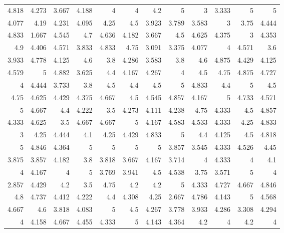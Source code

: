 \documentclass[10pt]{report}
\begin{document}
\begin{table}
    \centering
	\begin{tabular}{rrrrrrrrrrrr}
	
	\hline
	4.818 & 4.273 & 3.667 & 4.188 & 4     & 4     & 4.2   & 5     & 3     & 3.333 & 5     & 5     \\
	4.077 & 4.19  & 4.231 & 4.095 & 4.25  & 4.5   & 3.923 & 3.789 & 3.583 & 3     & 3.75  & 4.444 \\
	4.833 & 1.667 & 4.545 & 4.7   & 4.636 & 4.182 & 3.667 & 4.5   & 4.625 & 4.375 & 3     & 4.353 \\
	4.9   & 4.406 & 4.571 & 3.833 & 4.833 & 4.75  & 3.091 & 3.375 & 4.077 & 4     & 4.571 & 3.6   \\
	3.933 & 4.778 & 4.125 & 4.6   & 3.8   & 4.286 & 3.583 & 3.8   & 4.6   & 4.875 & 4.429 & 4.125 \\
	4.579 & 5     & 4.882 & 3.625 & 4.4   & 4.167 & 4.267 & 4     & 4.5   & 4.75  & 4.875 & 4.727 \\
	4     & 4.444 & 3.733 & 3.8   & 4.5   & 4.4   & 4.5   & 5     & 4.833 & 4.4   & 5     & 4.5   \\
	4.75  & 4.625 & 4.429 & 4.375 & 4.667 & 4.5   & 4.545 & 4.857 & 4.167 & 5     & 4.733 & 4.571 \\
	5     & 4.667 & 4.4   & 4.222 & 3.5   & 4.273 & 4.111 & 4.238 & 4.75  & 4.333 & 4.5   & 4.857 \\
	4.333 & 4.625 & 3.5   & 4.667 & 4.667 & 5     & 4.167 & 4.583 & 4.533 & 4.333 & 4.25  & 4.833 \\
	3     & 4.25  & 4.444 & 4.1   & 4.25  & 4.429 & 4.833 & 5     & 4.4   & 4.125 & 4.5   & 4.818 \\
	5     & 4.846 & 4.364 & 5     & 5     & 5     & 5     & 3.857 & 3.545 & 4.333 & 4.526 & 4.45  \\
	3.875 & 3.857 & 4.182 & 3.8   & 3.818 & 3.667 & 4.167 & 3.714 & 4     & 4.333 & 4     & 4.1   \\
	4     & 4.167 & 4     & 5     & 3.769 & 3.941 & 4.5   & 4.538 & 3.75  & 3.571 & 5     & 4     \\
	2.857 & 4.429 & 4.2   & 3.5   & 4.75  & 4.2   & 4.2   & 5     & 4.333 & 4.727 & 4.667 & 4.846 \\
	4.8   & 4.737 & 4.412 & 4.222 & 4.4   & 4.308 & 4.25  & 2.667 & 4.786 & 4.143 & 5     & 4.568 \\
	4.667 & 4.6   & 3.818 & 4.083 & 5     & 4.5   & 4.267 & 3.778 & 3.933 & 4.286 & 3.308 & 4.294 \\
	4     & 4.158 & 4.667 & 4.455 & 4.333 & 5     & 4.143 & 4.364 & 4.2   & 4     & 4.2   & 4     \\

\end{tabular}
\end{table}
\end{document}
